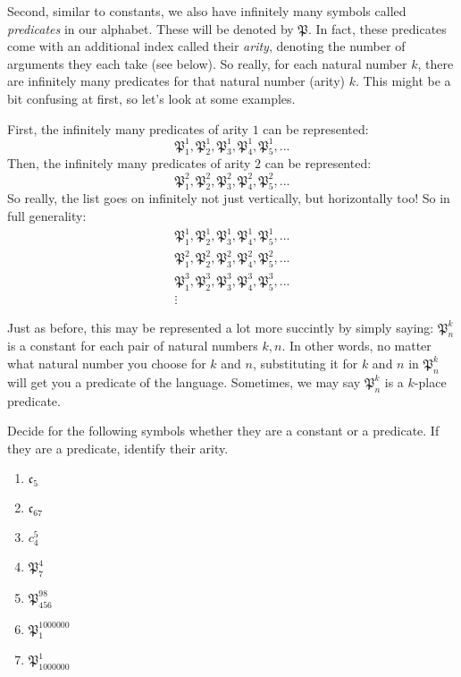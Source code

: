 Second, similar to constants, we also have infinitely many symbols called \textit{predicates} in our alphabet. These will be denoted by $\mathfrak{P}$. In fact, these predicates come with an additional index called their \textit{arity}, denoting the number of arguments they each take (see below). So really, for each natural number $k$, there are infinitely many predicates for that natural number (arity) $k$. This might be a bit confusing at first, so let's look at some examples. 

First, the infinitely many predicates of arity $1$ can be represented:
\[
\mathfrak{P}^1_1, \mathfrak{P}^1_2, \mathfrak{P}^1_3, \mathfrak{P}^1_4, \mathfrak{P}^1_5, ...
\]
Then, the infinitely many predicates of arity $2$ can be represented: 
\[
\mathfrak{P}^2_1, \mathfrak{P}^2_2, \mathfrak{P}^2_3, \mathfrak{P}^2_4, \mathfrak{P}^2_5, ...
\]
So really, the list goes on infinitely not just vertically, but horizontally too! So in full generality: 
\begin{gather*}
\mathfrak{P}^1_1, \mathfrak{P}^1_2, \mathfrak{P}^1_3, \mathfrak{P}^1_4, \mathfrak{P}^1_5, ...\\
\mathfrak{P}^2_1, \mathfrak{P}^2_2, \mathfrak{P}^2_3, \mathfrak{P}^2_4, \mathfrak{P}^2_5, ...\\
\mathfrak{P}^3_1, \mathfrak{P}^3_2, \mathfrak{P}^3_3, \mathfrak{P}^3_4, \mathfrak{P}^3_5, ...\\
\vdots
\end{gather*}

Just as before, this may be represented a lot more succintly by simply saying: $\mathfrak{P}^k_n$ is a constant for each pair of natural numbers $k, n$. In other words, no matter what natural number you choose for $k$ and $n$, substituting it for $k$ and $n$ in $\mathfrak{P}^k_n$ will get you a predicate of the language. Sometimes, we may say $\mathfrak{P}^k_n$ is a $k$-place predicate. 

\begin{exc}
Decide for the following symbols whether they are a constant or a predicate. If they are a predicate, identify their arity. 

\begin{enumerate}
	\item $\mathfrak{c}_5$
	\item $\mathfrak{c}_{67}$
	\item $c^5_4$
	\item $\mathfrak{P}^4_7$
	\item $\mathfrak{P}^{98}_{456}$
	\item $\mathfrak{P}^{1000000}_1$
	\item $\mathfrak{P}_{1000000}^1$
\end{enumerate}
\end{exc}

